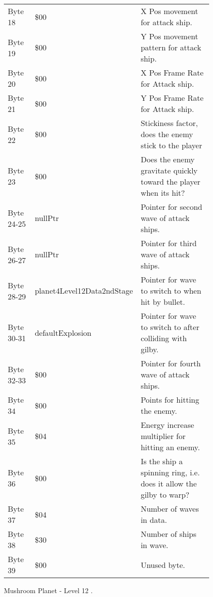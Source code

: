 \begin{figure}[H]
{\begin{adjustbox}{width=12cm}
\begin{tabular}{lll}
 Byte 18    & \$00                        & X Pos movement for attack ship.                                     \\
 Byte 19    & \$00                        & Y Pos movement pattern for attack ship.                             \\
 Byte 20    & \$00                        & X Pos Frame Rate for Attack ship.                                   \\
 Byte 21    & \$00                        & Y Pos Frame Rate for Attack ship.                                   \\
 Byte 22    & \$00                        & Stickiness factor, does the enemy stick to the player               \\
 Byte 23    & \$00                        & Does the enemy gravitate quickly toward the player when its hit?    \\
 Byte 24-25 & nullPtr                    & Pointer for second wave of attack ships.                            \\
 Byte 26-27 & nullPtr                    & Pointer for third wave of attack ships.                             \\
 Byte 28-29 & planet4Level12Data2ndStage & Pointer for wave to switch to when hit by bullet.                   \\
 Byte 30-31 & defaultExplosion           & Pointer for  wave to switch to after colliding with gilby.          \\
 Byte 32-33 & \$00                        & Pointer for fourth wave of attack ships.                            \\
 Byte 34    & \$00                        & Points for hitting the enemy.                                       \\
 Byte 35    & \$04                        & Energy increase multiplier for hitting an enemy.                    \\
 Byte 36    & \$00                        & Is the ship a spinning ring, i.e. does it allow the gilby to warp?  \\
 Byte 37    & \$04                        & Number of waves in data.                                            \\
 Byte 38    & \$30                        & Number of ships in wave.                                            \\
 Byte 39    & \$00                        & Unused byte.                                                        \\
\bottomrule
\end{tabular}

  \end{adjustbox}

  }\caption*{Mushroom Planet - Level 12
.}
\end{figure}

